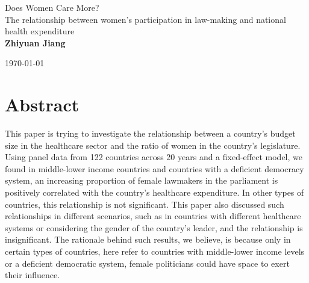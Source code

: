 \begin{titlepage}
\begin{center}
\vspace*{1cm}
\Huge

\vspace{0.5cm}
\LARGE
Does Women Care More?\\
The relationship between women's participation in law-making and national health expenditure
\\

\vspace{1.5 cm}
\textbf{Zhiyuan Jiang\\}
\vfill

\vspace{0.8cm}
 
\Large
\today
\end{center}
\end{titlepage}


\section*{Abstract}

This paper is trying to investigate the relationship between a country's budget size in the healthcare sector and the ratio of women in the country's legislature. 
Using panel data from 122 countries across 20 years and a fixed-effect model, we found in middle-lower income countries and countries with a deficient democracy system, an increasing proportion of female lawmakers in the parliament is positively correlated with the country's healthcare expenditure.
In other types of countries, this relationship is not significant.
This paper also discussed such relationships in different scenarios, such as in countries with different healthcare systems or considering the gender of the country's leader, and the relationship is insignificant. 
The rationale behind such results, we believe, is because only in certain types of countries, here refer to countries with middle-lower income levels or a deficient democratic system, female politicians could have space to exert their influence. 